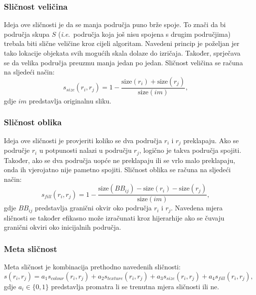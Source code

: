 \documentclass[times, utf8, diplomski]{fer}
\begin{document}
\subsubsection{Sličnost veličina}
Ideja ove sličnosti je da se manja područja puno brže spoje. To znači da bi područja skupa $S$ (\textit{i.e}.\ područja koja još nisu spojena s drugim područjima) trebala biti slične veličine kroz cijeli algoritam. Navedeni princip je poželjan jer tako lokacije objekata svih mogućih skala dolaze do izričaja. Također, sprječava se da velika područja preuzmu manja jedan po jedan. Sličnost veličina se računa na sljedeći način:
\begin{equation}
    s_{size}(r_i,r_j) = 1 - \frac{\text{size}(r_i) + \text{size}(r_j)}{\text{size}(im)},
\end{equation}
gdje $im$ predstavlja originalnu sliku.

\subsubsection{Sličnost oblika}
Ideja ove sličnosti je provjeriti koliko se dva područja $r_i$ i $r_j$ preklapaju. Ako se područje $r_i$ u potpunosti nalazi u području $r_j$, logično je takva područja spojiti. Također, ako se dva područja uopće ne preklapaju ili se vrlo malo preklapaju, onda ih vjerojatno nije pametno spojiti. Sličnost oblika se računa na sljedeći način:
\begin{equation}
    s_{fill}(r_i,r_j) = 1 - \frac{\text{size}(BB_{ij}) - \text{size}(r_i) - \text{size}(r_j)}{\text{size}(im)},
\end{equation}
gdje $BB_{ij}$ predstavlja granični okvir  oko područja $r_i$ i $r_j$. Navedena mjera sličnosti se također efikasno može izračunati kroz hijerarhije ako se čuvaju granični okviri oko inicijalnih područja.

\subsubsection{Meta sličnost}
Meta sličnost je kombinacija prethodno navedenih sličnosti:
\begin{equation}
    s(r_i,r_j) = a_1s_{colour}(r_i,r_j) + a_2s_{texture}(r_i,r_j) + a_3s_{size}(r_i,r_j) + a_4s_{fill}(r_i,r_j),
\end{equation}
gdje $a_i \in \{0,1\}$ predstavlja promatra li se trenutna mjera sličnosti ili ne.
\end{document}
